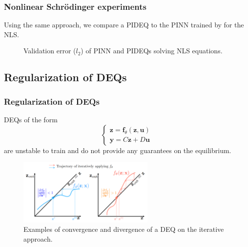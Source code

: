 \documentclass[t]{beamer}
\begin{document}
\begin{frame}
    \frametitle{Nonlinear Schrödinger experiments}
    Using the same approach, we compare a PIDEQ to the PINN trained by \cite{Raissi2019} for the NLS.
    \pause
    \begin{figure}[h]
        \centering
        \caption{Validation error ($l_2$) of PINN and PIDEQs solving NLS equations.}
        \label{fig:nls-validation-ls-png}
    \end{figure}
\end{frame}

\subsection{Regularization of DEQs}

\begin{frame}
    \frametitle{Regularization of DEQs}
    DEQs of the form \[
    \begin{cases}
	\bm{z} = \bm{f}_{\theta}\left( \bm{z},\bm{u} \right)  \\
	\bm{y} = C\bm{z} + D\bm{u}
    \end{cases}
    \] are unstable to train and do not provide any guarantees on the equilibrium.

    \begin{figure}[h]
        \centering
        \includegraphics[width=0.6\textwidth]{reg-jac-f-theta.png}
        \caption{Examples of convergence and divergence of a DEQ on the iterative approach.}
        \label{fig:reg-jac-f-theta-png}
    \end{figure}
\end{frame}
\end{document}
